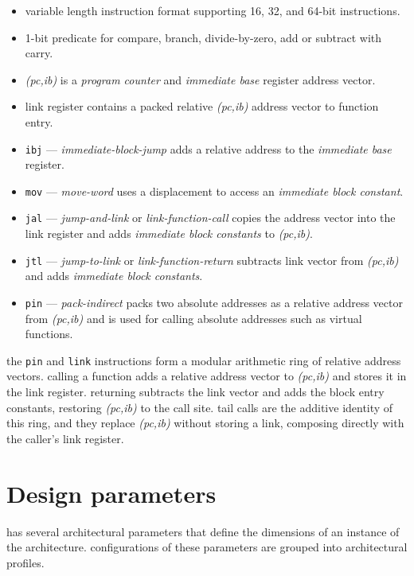 \begin{itemize}[itemsep=0pt]
\item variable length instruction format supporting 16, 32, and 64-bit
instructions.
\item 1-bit predicate for compare, branch, divide-by-zero, add or subtract
with carry.
\item \emph{(pc,ib)} is a \emph{program counter} and
\emph{immediate base} register address vector.
\item link register contains a packed relative \emph{(pc,ib)} address vector
to function entry.
\item \texttt{ibj} --- \emph{immediate-block-jump} adds a relative address
to the \emph{immediate base} register.
\item \texttt{mov} --- \emph{move-word} uses a displacement to access an
\emph{immediate block constant}.
\item \texttt{jal} --- \emph{jump-and-link} or \emph{link-function-call}
copies the address vector into the link register and adds \emph{immediate
block constants} to \emph{(pc,ib)}.
\item \texttt{jtl} --- \emph{jump-to-link} or \emph{link-function-return}
subtracts link vector from \emph{(pc,ib)} and adds \emph{immediate block
constants}.
\item \texttt{pin} --- \emph{pack-indirect} packs two absolute addresses
as a relative address vector from \emph{(pc,ib)} and is used for calling
absolute addresses such as virtual functions.
\end{itemize}

\par\noindent
the \texttt{pin} and \texttt{link} instructions form a modular arithmetic
ring of relative address vectors. calling a function adds a relative
address vector to \emph{(pc,ib)} and stores it in the link register.
returning subtracts the link vector and adds the block entry constants,
restoring \emph{(pc,ib)} to the call site. tail calls are the additive
identity of this ring, and they replace \emph{(pc,ib)} without storing a
link, composing directly with the caller's link register.

\newpage
\section{Design parameters}

\par\noindent
\arch{} has several architectural parameters that define the dimensions of an
instance of the architecture.
configurations of these parameters are grouped into architectural profiles.

